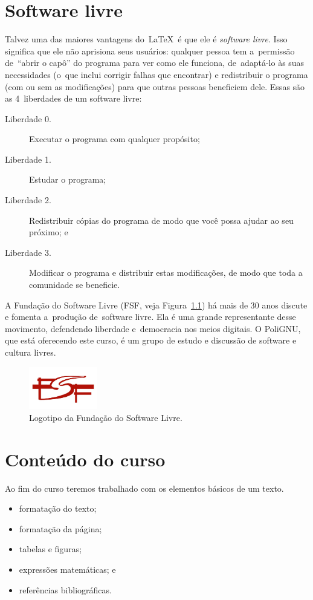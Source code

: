 \documentclass[a5paper,11pt,article,oneside]{memoir}
\let\velhoEmph\emph
\renewcommand{\emph}[1]{\textcolor{blue!80!black}{\velhoEmph{#1}}}
\begin{document}
\chapter{Software livre}

Talvez uma das maiores vantagens do~\LaTeX\ é que ele é
\emph{software livre}. Isso significa que ele não aprisiona seus usuários:
qualquer pessoa tem a~permissão de~``abrir o capô'' do programa 
para ver como ele funciona, de~adaptá-lo às suas necessidades (o~que 
inclui corrigir falhas que encontrar) e redistribuir o programa (com ou sem
as modificações) para que outras pessoas beneficiem dele. Essas são
as 4~liberdades de um software livre:


\begin{description}
\item[\small Liberdade 0.] Executar o programa com qualquer propósito;
\item[\small Liberdade 1.] Estudar o programa;
\item[\small Liberdade 2.] Redistribuir cópias do programa de modo que você possa ajudar ao seu próximo; e
\item[\small Liberdade 3.] Modificar o programa e distribuir estas modificações, de modo que toda a comunidade se beneficie.
\end{description}
A Fundação do Software Livre (FSF, veja Figura~\ref{fig:logo-fsf})
há mais de 30 anos discute e fomenta a~produção
de~software livre. Ela é uma grande representante desse movimento,
defendendo liberdade e~democracia nos meios digitais.
O PoliGNU, que está oferecendo este curso, é um grupo de estudo 
e discussão de software e cultura livres.

\begin{figure}
\centering
\includegraphics[width=3cm]{FSF_logo_menor}%
\caption{Logotipo da Fundação do Software Livre.}\label{fig:logo-fsf}
\end{figure}

\chapter{Conteúdo do curso}

Ao fim do curso teremos trabalhado com os
elementos básicos de um texto.

\begin{itemize}
\item formatação do texto;
\item formatação da página;
\item tabelas e figuras;
\item expressões matemáticas; e
\item referências bibliográficas.
\end{itemize}
\end{document}
